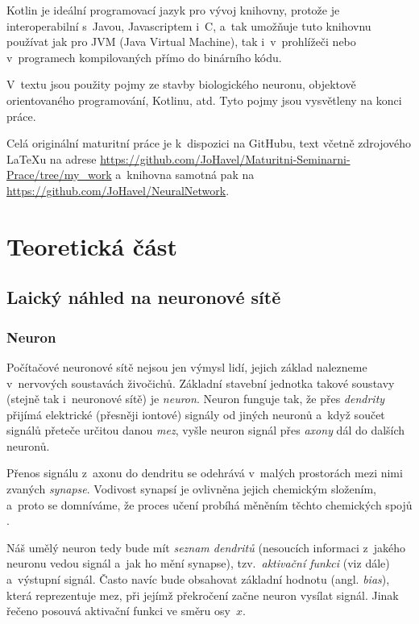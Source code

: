\documentclass[12pt]{report}			%
\begin{document}
		\gls{Kotlin} je ideální programovací jazyk pro vývoj knihovny, protože je interoperabilní s~Javou, Javascriptem i~C, a~tak umožňuje tuto knihovnu používat jak pro \gls{JVM} (Java Virtual Machine), tak i~v~prohlížeči nebo v~programech kompilovaných přímo do binárního kódu.
		
		V~textu jsou použity pojmy ze stavby biologického neuronu, objektově orientovaného programování, \gls{Kotlin}u, atd. Tyto pojmy jsou vysvětleny na konci práce. 
		
		Celá originální maturitní práce je k~dispozici na GitHubu, text včetně zdrojového LaTeXu na adrese \url{https://github.com/JoHavel/Maturitni-Seminarni-Prace/tree/my\_work} a~knihovna samotná pak na \url{https://github.com/JoHavel/NeuralNetwork}.
	
	
	\part{Teoretická část}
		
			\chapter{Laický náhled na neuronové sítě}
			
				\section{Neuron}
					Počítačové neuronové sítě nejsou jen výmysl lidí, jejich základ nalezneme v~nervových soustavách živočichů. Základní stavební jednotka takové soustavy (stejně tak i~neuronové sítě) je \emph{neuron}. Neuron funguje tak, že přes \emph{\gls{dendrit}y} přijímá elektrické (přesněji iontové) signály od jiných neuronů a~když součet signálů přeteče určitou danou \emph{mez}, vyšle neuron signál přes \emph{\gls{axon}y} dál do dalších neuronů.
					
					Přenos signálu z~\gls{axon}u do \gls{dendrit}u se odehrává v~malých prostorách mezi nimi zvaných \emph{\gls{synapse}}. Vodivost synapsí je ovlivněna jejich chemickým složením, a~proto se domníváme, že proces učení probíhá měněním těchto chemických spojů \autocite[s. 491]{book:Informatika}.
					
					Náš umělý neuron tedy bude mít \emph{seznam \gls{dendrit}ů} (nesoucích informaci z~jakého neuronu vedou signál a~jak ho mění \gls{synapse}), tzv.~\emph{aktivační funkci} (viz dále) a~výstupní signál. Často navíc bude obsahovat základní hodnotu (angl. \emph{bias}), která reprezentuje mez, při jejímž překročení začne neuron vysílat signál. Jinak řečeno posouvá aktivační funkci ve směru osy~$x$.
					
\end{document}
